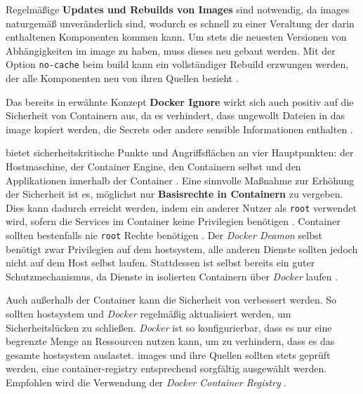 Regelmäßige \textbf{Updates und Rebuilds von Images} sind notwendig, da \Glspl{image} naturgemäß unveränderlich sind, wodurch es schnell zu einer Veraltung der darin enthaltenen Komponenten kommen kann. Um stets die neuesten Versionen von Abhängigkeiten im \Gls{image} zu haben, muss dieses neu gebaut werden. Mit der Option \texttt{no-cache} beim \Gls{build} kann ein vollständiger Rebuild erzwungen werden, der alle Komponenten neu von ihren Quellen bezieht \cite{300:Building-Best-Practices}.

Das bereits in  erwähnte Konzept \textbf{Docker Ignore} wirkt sich auch positiv auf die Sicherheit von Containern aus, da es verhindert, dass ungewollt Dateien in das \Gls{image} kopiert werden, die Secrets oder andere sensible Informationen enthalten \cite{300:Building-Best-Practices}.

 bietet sicherheitskritische Punkte und Angriffsflächen an vier Hauptpunkten: der Hostmaschine, der Container Engine, den Containern selbst und den Applikationen innerhalb der Container \cite{021:Docker-Security-Threat-Model-and-Best-Practices}. Eine sinnvolle Maßnahme zur Erhöhung der Sicherheit ist es, möglichst nur \textbf{Basisrechte in Containern} zu vergeben. Dies kann dadurch erreicht werden, indem ein anderer Nutzer als \texttt{root} verwendet wird, sofern die Services im Container keine Privilegien benötigen \cite{021:Docker-Security-Threat-Model-and-Best-Practices,024:Investiugating-Impact-of-Containerization-on-Deployment-Process-in-DevOps,300:Building-Best-Practices}. Container sollten bestenfalls nie \texttt{root} Rechte benötigen \cite{022:Automated-Cloud-Infrastructure-Continous-Integration-and-Continous-Delivery-using-Docker}. Der \textit{Docker Deamon} selbst benötigt zwar Privilegien auf dem \Gls{hostsystem}, alle anderen Dienste sollten jedoch nicht auf dem Host selbst laufen. Stattdessen ist  selbst bereits ein guter Schutzmechanismus, da Dienste in isolierten Containern über \textit{Docker} laufen \cite{022:Automated-Cloud-Infrastructure-Continous-Integration-and-Continous-Delivery-using-Docker}.

Auch außerhalb der Container kann die Sicherheit von  verbessert werden. So sollten \Gls{hostsystem} und \textit{Docker} regelmäßig aktualisiert werden, um Sicherheitslücken zu schließen. \textit{Docker} ist so konfigurierbar, dass es nur eine begrenzte Menge an Ressourcen nutzen kann, um zu verhindern, dass es das gesamte \Gls{hostsystem} auslastet. \Glspl{image} und ihre Quellen sollten stets geprüft werden, eine \Gls{container-registry} entsprechend sorgfältig ausgewählt werden. Empfohlen wird die Verwendung der \textit{Docker Container Registry} \cite{021:Docker-Security-Threat-Model-and-Best-Practices}.

